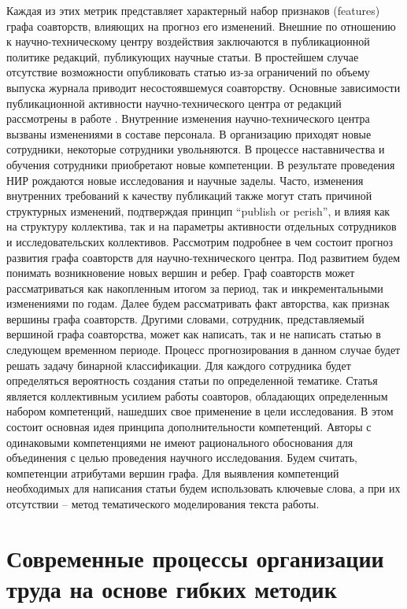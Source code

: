 Каждая из этих метрик представляет характерный набор признаков (features) графа соавторств, влияющих на прогноз его изменений. 
Внешние по отношению к научно-техническому центру воздействия заключаются в публикационной политике редакций, публикующих научные статьи. 
В простейшем случае отсутствие возможности опубликовать статью из-за ограничений по объему выпуска журнала приводит несостоявшемуся соавторству. 
Основные зависимости публикационной активности научно-технического центра от редакций рассмотрены в работе \cite{krasnov2017model}.
Внутренние изменения научно-технического центра вызваны изменениями в составе персонала. 
В организацию приходят новые сотрудники, некоторые сотрудники увольняются.
В процессе наставничества и обучения сотрудники приобретают новые компетенции. 
В результате проведения НИР рождаются новые исследования и научные заделы. 
Часто, изменения внутренних требований к качеству публикаций также могут стать причиной структурных изменений, подтверждая принцип “publish or perish”, и влияя как на структуру коллектива, так и на параметры активности отдельных сотрудников и исследовательских коллективов.
Рассмотрим подробнее в чем состоит прогноз развития графа соавторств для научно-технического центра. 
Под развитием будем понимать возникновение новых вершин и ребер. 
Граф соавторств может рассматриваться как накопленным итогом за период, так и инкрементальными изменениями по годам. 
Далее будем рассматривать факт авторства, как признак вершины графа соавторств.
Другими словами, сотрудник, представляемый вершиной графа соавторства, может как написать, так и не написать статью в следующем временном периоде. 
Процесс прогнозирования в данном случае будет решать задачу бинарной классификации. 
Для каждого сотрудника будет определяться вероятность создания статьи по определенной тематике. 
Статья является коллективным усилием работы соавторов, обладающих определенным набором компетенций, нашедших свое применение в цели исследования.
В этом состоит основная идея принципа дополнительности компетенций. 
Авторы с одинаковыми компетенциями не имеют рационального обоснования для объединения с целью проведения научного исследования. 
Будем считать, компетенции атрибутами вершин графа.  
Для выявления компетенций необходимых для написания статьи будем использовать ключевые слова, а при их отсутствии – метод тематического моделирования текста работы.

\section{Современные процессы организации труда на основе гибких методик}

